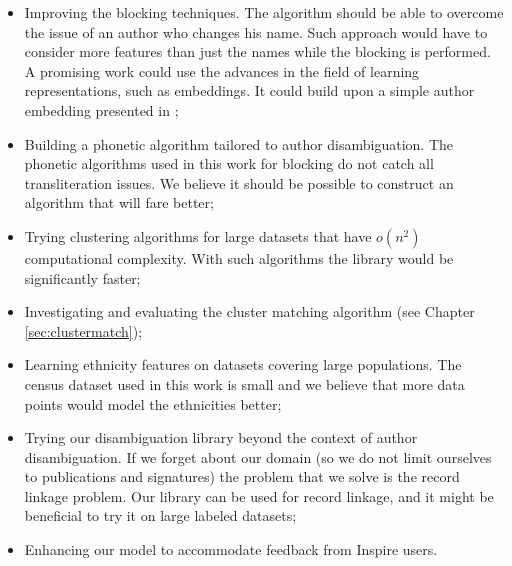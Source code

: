 \documentclass{pracamgr}
\begin{document}
\begin{itemize}

\item{Improving the blocking techniques. The algorithm should be able to overcome the issue of an author
who changes his name. Such approach would have to consider more features than
just the names while the blocking is performed. A promising work could
use the advances in the field of learning representations, such as embeddings. It could
build upon a simple author embedding presented in \citep{author2vec};}

\item{Building a phonetic algorithm tailored to author disambiguation. The phonetic
algorithms used in this work for blocking do not catch all transliteration issues.
We believe it should be possible to construct an algorithm that will fare better;}

\item{Trying clustering algorithms for large datasets
that have $o(n^2)$ computational complexity. With
such algorithms the library would be significantly faster;}

\item{Investigating and evaluating the cluster matching algorithm (see Chapter \ref{sec:clustermatch});}

\item{Learning ethnicity features on datasets covering large populations. The census
dataset used in this work is small and we believe that more data points would
model the ethnicities better;}

\item{Trying our disambiguation library beyond the context of author disambiguation.
If we forget about our domain (so we do not limit ourselves to
publications and signatures) the problem that we solve is the record linkage problem.
Our library can be used for record linkage, and it might be beneficial to try it
on large labeled datasets;}

\item{Enhancing our model to accommodate feedback from Inspire users.}

\end{itemize}



\end{document}
